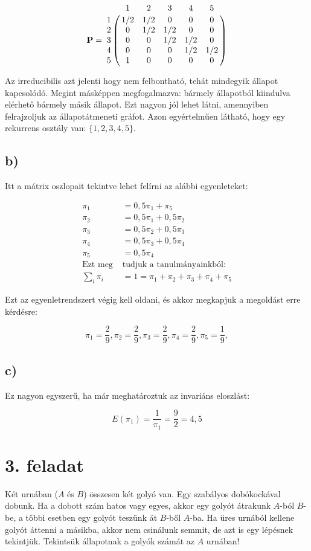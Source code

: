 \documentclass[a4paper,12pt]{article}   		%
\begin{document}
\[
\mathbf{P} = 
\bordermatrix{
~	&	1	&	2	&	3	&	4	&	5	\cr
1	&	1/2	&	1/2	&	0	&	0	&	0	\cr
2	&	0	&	1/2	&	1/2	&	0	&	0	\cr
3	&	0	&	0	&	1/2	&	1/2	&	0	\cr
4	&	0	&	0	&	0	&	1/2	&	1/2	\cr
5	&	1	&	0	&	0	&	0	&	0}
\]

Az irreducibilis azt jelenti hogy nem felbontható, tehát mindegyik 
állapot kapcsolódó. Megint másképpen megfogalmazva: bármely 
állapotból kiindulva elérhető bármely másik állapot. Ezt nagyon jól
lehet látni, amennyiben felrajzoljuk az állapotátmeneti gráfot.
Azon egyértelműen látható, hogy egy rekurrens osztály van:
$\{1, 2, 3, 4, 5\}$.

\subsection*{b)}
Itt a mátrix oszlopait tekintve lehet felírni az alábbi egyenleteket:

\begin{align*}
\pi_1 &= 0,5 \pi_1 + \pi_5 \\
\pi_2 &= 0,5 \pi_1 + 0,5 \pi_2 \\
\pi_3 &= 0,5 \pi_2 + 0,5 \pi_3 \\
\pi_4 &= 0,5 \pi_3 + 0,5 \pi_4 \\
\pi_5 &= 0,5 \pi_4 \\
\text{Ezt meg } &\text{tudjuk a tanulmányainkból:} \\
\sum_{i} \pi_i &= 1 = \pi_1 + \pi_2 + \pi_3 + \pi_4 + \pi_5
\end{align*}

Ezt az egyenletrendszert végig kell oldani, és akkor megkapjuk a
megoldást erre kérdésre:

\[
\pi_1 = \frac{2}{9},
\pi_2 = \frac{2}{9},
\pi_3 = \frac{2}{9},
\pi_4 = \frac{2}{9},
\pi_5 = \frac{1}{9},
\]

\subsection*{c)}
Ez nagyon egyszerű, ha már meghatároztuk az invariáns eloszlást:

\[
E(\pi_1) = \frac{1}{\pi_1} = \frac{9}{2} = 4,5
\]

\pagebreak
\section*{3. feladat}
Két urnában ($A$ és $B$) összesen két golyó van. Egy szabályos 
dobókockával dobunk. Ha a dobott szám hatos vagy egyes, akkor egy
golyót átrakunk $A$-ból $B$-be, a többi esetben egy golyót teszünk
át $B$-ből $A$-ba. Ha üres urnából kellene golyót áttenni a másikba,
akkor nem csinálunk semmit, de azt is egy lépésnek tekintjük.
Tekintsük állapotnak a golyók számát az $A$ urnában!
\end{document}
